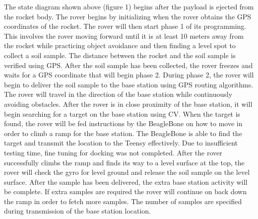 \documentclass[onecolumn, draftclsnofoot, 10pt, compsoc]{IEEEtran}
\begin{document}
\newpage
The state diagram shown above (figure 1) begins after the payload is ejected from the rocket body. The rover begins by initializing when the rover obtains the GPS coordinates of the rocket. The rover will then start phase 1 of its programming. This involves the rover moving forward until it is at least 10 meters away from the rocket while practicing object avoidance and then finding a level spot to collect a soil sample. The distance between the rocket and the soil sample is verified using GPS. After the soil sample has been collected, the rover freezes and waits for a GPS coordinate that will begin phase 2. During phase 2, the rover will begin to deliver the soil sample to the base station using GPS routing algorithms. The rover will travel in the direction of the base station while continuously avoiding obstacles. After the rover is in close proximity of the base station, it will begin searching for a target on the base station using CV. When the target is found, the rover will be fed instructions by the BeagleBone on how to move in order to climb a ramp for the base station. The BeagleBone is able to find the target and transmit the location to the Teensy effectively. Due to insufficient testing time, fine tuning for docking was not completed. After the rover successfully climbs the ramp and finds its way to a level surface at the top, the rover will check the gyro for level ground and release the soil sample on the level surface. After the sample has been delivered, the extra base station activity will be complete. If extra samples are required the rover will continue on back down the ramp in order to fetch more samples. The number of samples are specified during transmission of the base station location.
\end{document}
